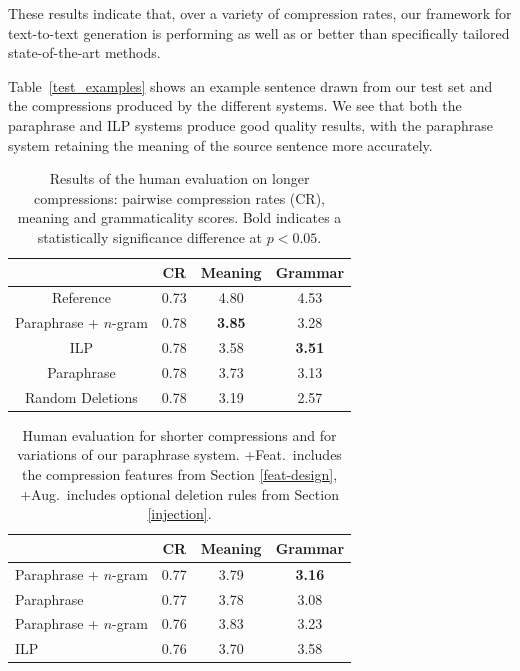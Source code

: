 \documentclass[11pt]{article}
\begin{document}
These results indicate that, over a variety of compression rates, our
framework for text-to-text generation is performing as well as or
better than specifically tailored state-of-the-art methods.

Table~\ref{test_examples} shows an example sentence drawn from our
test set and the compressions produced by the different systems. We
see that both the paraphrase and ILP systems produce good quality
results, with the paraphrase system retaining the meaning of the
source sentence more accurately.


 \begin{table}
   \small
   \begin{center}
     \begin{tabular}{|c|c|c|c|}
       \hline
       & CR & Meaning & Grammar \\
       \hline
       Reference & 0.73 &  4.80 & 4.53 \\
       \hline
       \hline
       Paraphrase + $n$-gram & 0.78 & {\bf 3.85} & 3.28 \\
       ILP & 0.78 & 3.58 & {\bf 3.51} \\
       Paraphrase & 0.78 & 3.73 & 3.13 \\
       \hline
       \hline
       Random Deletions & 0.78 & 3.19 & 2.57 \\
       \hline
     \end{tabular}
   \end{center}
   \normalsize
   \caption{Results of the human evaluation on longer compressions:
     pairwise compression rates (CR), meaning and grammaticality scores. 
     Bold indicates a statistically significance difference at $p <
     0.05$.}
   \label{human_judgments}
 \end{table}

\begin{table}
   \small
   \begin{center}
     \begin{tabular}{|l|c|c|c|}
       \hline
       & CR & Meaning & Grammar \\
       \hline
       Paraphrase + $n$-gram & 0.77 & 3.79 & {\bf 3.16} \\
       Paraphrase & 0.77 & 3.78 & 3.08 \\
       \hline
       \hline
       Paraphrase + $n$-gram & 0.76 & 3.83 & 3.23 \\
       ILP & 0.76 & 3.70 & 3.58 \\
       \hline
    \end{tabular}
   \end{center}
   \normalsize
   \caption{Human evaluation for shorter compressions and for
     variations of our paraphrase system.  +Feat.\ includes the
     compression features from Section \ref{feat-design}, +Aug.\
     includes optional deletion rules from Section
     \ref{injection}. \vspace{-.5cm}}
   \label{comparison}
 \end{table}
\end{document}
